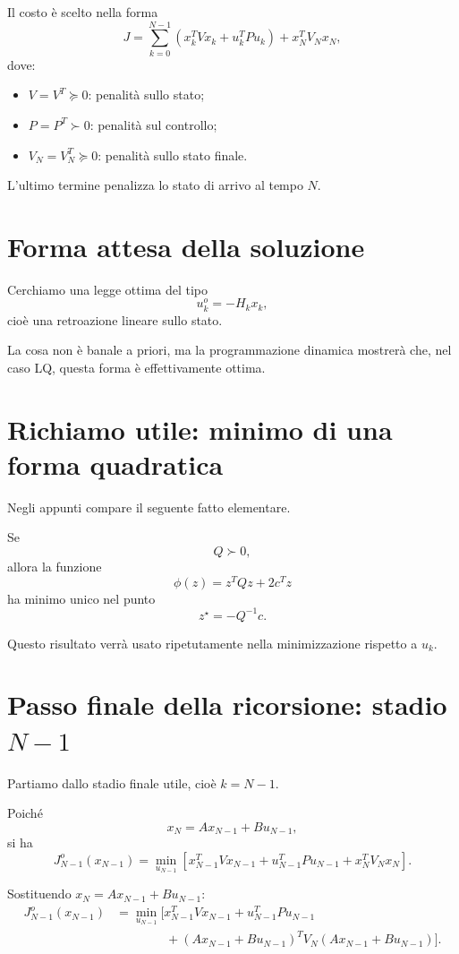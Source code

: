 Il costo è scelto nella forma
\[
J
=
\sum_{k=0}^{N-1}
\left(
x_k^T V x_k + u_k^T P u_k
\right)
+
x_N^T V_N x_N,
\]
dove:
\begin{itemize}
    \item \(V=V^T\succeq 0\): penalità sullo stato;
    \item \(P=P^T\succ 0\): penalità sul controllo;
    \item \(V_N=V_N^T\succeq 0\): penalità sullo stato finale.
\end{itemize}

L'ultimo termine penalizza lo stato di arrivo al tempo \(N\).

\section{Forma attesa della soluzione}

Cerchiamo una legge ottima del tipo
\[
u_k^o=-H_k x_k,
\]
cioè una retroazione lineare sullo stato.

La cosa non è banale a priori, ma la programmazione dinamica mostrerà che,
nel caso LQ, questa forma è effettivamente ottima.

\section{Richiamo utile: minimo di una forma quadratica}

Negli appunti compare il seguente fatto elementare.

Se
\[
Q\succ 0,
\]
allora la funzione
\[
\phi(z)=z^TQz+2c^Tz
\]
ha minimo unico nel punto
\[
z^\star=-Q^{-1}c.
\]

Questo risultato verrà usato ripetutamente nella minimizzazione rispetto a \(u_k\).

\section{Passo finale della ricorsione: stadio \(N-1\)}

Partiamo dallo stadio finale utile, cioè \(k=N-1\).

Poiché
\[
x_N=Ax_{N-1}+Bu_{N-1},
\]
si ha
\[
J_{N-1}^o(x_{N-1})
=
\min_{u_{N-1}}
\left[
x_{N-1}^T V x_{N-1}
+
u_{N-1}^T P u_{N-1}
+
x_N^T V_N x_N
\right].
\]

Sostituendo \(x_N=Ax_{N-1}+Bu_{N-1}\):
\[
\begin{aligned}
J_{N-1}^o(x_{N-1})
&=
\min_{u_{N-1}}
\Big[
x_{N-1}^T V x_{N-1}
+
u_{N-1}^T P u_{N-1}\\
&\qquad\qquad
+
(Ax_{N-1}+Bu_{N-1})^T
V_N
(Ax_{N-1}+Bu_{N-1})
\Big].
\end{aligned}
\]

